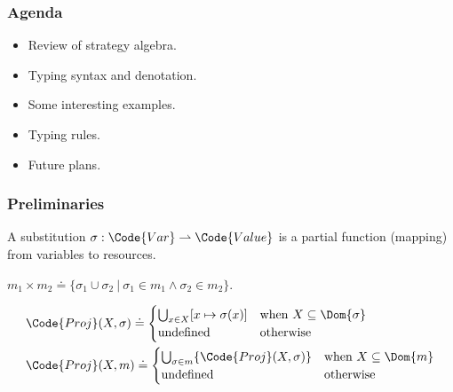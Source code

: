 \newcommand{\substxy}[3]{\textcolor{#1}{[x\mapsto {#2}; y\mapsto {#3}]}}
\newcommand{\subExt}{\boxed{o}}
\newcommand{\supExt}{\boxed{u}}
\newcommand{\landp}{\land_p}
\newcommand{\lorp}{\lor_p}
\newcommand{\implp}{{\implies_{\!\!\!\!p}}}
\newcommand{\timesp}{\times_p}
\newcommand{\topp}{\top_p}
\newcommand{\botp}{\bot_p}
\newcommand{\negp}{\neg_p}
\newcommand{\forallp}{\forall_p}
\newcommand{\existsp}{\exists_p}

\begin{frame}[fragile]
    \frametitle{Agenda}

    \begin{itemize}
        \item Review of strategy algebra.
        \item Typing syntax and denotation.
        \item Some interesting examples.
        \item Typing rules.
        \item Future plans.
    \end{itemize}
\end{frame} 

\begin{frame}[fragile]
    \frametitle{Preliminaries}

\begin{definition}[Substitution] 
    A substitution $\sigma: \Code{Var} \rightharpoonup \Code{Value}$ is a partial function (mapping) from variables to resources.
\end{definition}

\begin{definition} $m_1 \times m_2 \doteq \{ \sigma_1 \cup \sigma_2 ~|~ \sigma_1 \in m_1 \land \sigma_2 \in m_2 \}$.
\end{definition}

\begin{definition}[Projection]
    \begin{align*}
    &\Code{Proj}(X, \sigma) \doteq
        \begin{cases}
            \bigcup_{x \in X} [x\mapsto \sigma(x)] & \text{when } X \subseteq \Dom{\sigma} \\
            \text{undefined} & \text{otherwise}
        \end{cases}
    \\&\Code{Proj}(X, m) \doteq
    \begin{cases}
        \bigcup_{\sigma \in m} \{ \Code{Proj}(X, \sigma) \} & \text{when } X \subseteq \Dom{m} \\
        \text{undefined} & \text{otherwise}
    \end{cases}
    \end{align*}
\end{definition}
    
\end{frame}

